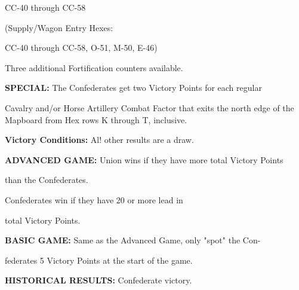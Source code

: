 \begin{scenariodata}
CC-40 through CC-58\\
\end{scenariodata}

\begin{scenariodata}
(Supply/Wagon Entry Hexes:\\
\end{scenariodata}

\begin{scenariodata}
CC-40 through CC-58, O-51, M-50, E-46)\\
\end{scenariodata}

Three additional Fortification counters available.

\begin{scenariodata}
\textbf{SPECIAL:} The Confederates get two Victory Points for each regular\\
\end{scenariodata}

Cavalry and/or Horse Artillery Combat Factor that exits the north edge of the Mapboard from Hex rows K through T, inclusive.

\begin{scenariodata}
\textbf{Victory Conditions:} Al! other results are a draw.\\
\end{scenariodata}

\begin{scenariodata}
\textbf{ADVANCED GAME:} Union wins if they have more total Victory Points\\
\end{scenariodata}

than the Confederates.

\begin{scenariodata}
Confederates win if they have 20 or more lead in\\
\end{scenariodata}

total Victory Points.

\begin{scenariodata}
\textbf{BASIC GAME:} Same as the Advanced Game, only "spot" the Con-\\
\end{scenariodata}

federates 5 Victory Points at the start of the game.

\begin{scenariodata}
\textbf{HISTORICAL RESULTS:} Confederate victory.\\
\end{scenariodata}

